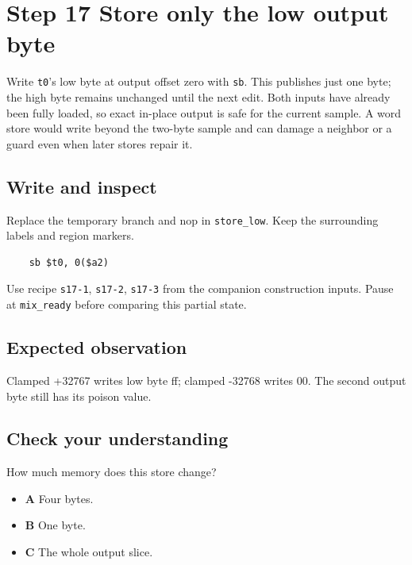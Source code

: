 \section{Step 17 Store only the low output byte}\label{pcm-s17}

Write \texttt{t0}’s low byte at output offset zero with \texttt{sb}. This publishes just one byte; the high byte remains unchanged until the next edit. Both inputs have already been fully loaded, so exact in-place output is safe for the current sample. A word store would write beyond the two-byte sample and can damage a neighbor or a guard even when later stores repair it.

\subsection{Write and inspect}
Replace the temporary branch and nop in \texttt{store\_low}. Keep the surrounding labels and region markers.

\begin{verbatim}
    sb $t0, 0($a2)
\end{verbatim}
Use recipe \texttt{s17-1}, \texttt{s17-2}, \texttt{s17-3} from the companion construction inputs. Pause at \texttt{mix\_ready} before comparing this partial state.

\subsection{Expected observation}
Clamped +32767 writes low byte ff; clamped -32768 writes 00. The second output byte still has its poison value.

\subsection{Check your understanding}
How much memory does this store change?

\begin{itemize}
  \item \textbf{A} Four bytes.
  \item \textbf{B} One byte.
  \item \textbf{C} The whole output slice.
\end{itemize}
